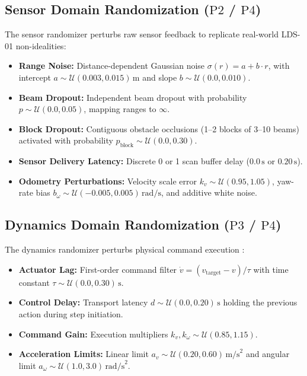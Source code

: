 \documentclass[conference]{IEEEtran}
\begin{document}
\subsection{Sensor Domain Randomization ($\text{P2}$ / $\text{P4}$)}
The sensor randomizer perturbs raw sensor feedback to replicate real-world LDS-01 non-idealities:
\begin{itemize}
    \item \textbf{Range Noise:} Distance-dependent Gaussian noise $\sigma(r) = a + b \cdot r$, with intercept $a \sim \mathcal{U}(0.003, 0.015)\,\text{m}$ and slope $b \sim \mathcal{U}(0.0, 0.010)$.
    \item \textbf{Beam Dropout:} Independent beam dropout with probability $p \sim \mathcal{U}(0.0, 0.05)$, mapping ranges to $\infty$.
    \item \textbf{Block Dropout:} Contiguous obstacle occlusions (1--2 blocks of 3--10 beams) activated with probability $p_{\text{block}} \sim \mathcal{U}(0.0, 0.30)$.
    \item \textbf{Sensor Delivery Latency:} Discrete 0 or 1 scan buffer delay ($0.0\,\text{s}$ or $0.20\,\text{s}$).
    \item \textbf{Odometry Perturbations:} Velocity scale error $k_v \sim \mathcal{U}(0.95, 1.05)$, yaw-rate bias $b_\omega \sim \mathcal{U}(-0.005, 0.005)\,\text{rad/s}$, and additive white noise.
\end{itemize}

\subsection{Dynamics Domain Randomization ($\text{P3}$ / $\text{P4}$)}
The dynamics randomizer perturbs physical command execution \cite{peng2018sim}:
\begin{itemize}
    \item \textbf{Actuator Lag:} First-order command filter $\dot{v} = (v_{\text{target}} - v) / \tau$ with time constant $\tau \sim \mathcal{U}(0.0, 0.30)\,\text{s}$.
    \item \textbf{Control Delay:} Transport latency $d \sim \mathcal{U}(0.0, 0.20)\,\text{s}$ holding the previous action during step initiation.
    \item \textbf{Command Gain:} Execution multipliers $k_v, k_\omega \sim \mathcal{U}(0.85, 1.15)$.
    \item \textbf{Acceleration Limits:} Linear limit $a_v \sim \mathcal{U}(0.20, 0.60)\,\text{m/s}^2$ and angular limit $a_\omega \sim \mathcal{U}(1.0, 3.0)\,\text{rad/s}^2$.
\end{itemize}
\end{document}
